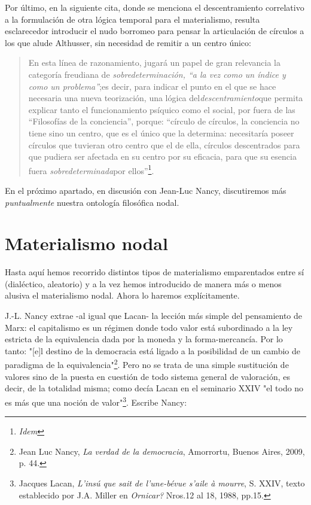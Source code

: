 \documentclass{book}
\begin{document}
Por último, en la siguiente cita, donde se menciona el descentramiento
correlativo a la formulación de otra lógica temporal para el
materialismo, resulta esclarecedor introducir el nudo borromeo para
pensar la articulación de círculos a los que alude Althusser, sin
necesidad de remitir a un centro único:

\begin{quote}
En esta línea de razonamiento, jugará un papel de gran relevancia la
categoría freudiana de \emph{sobredeterminación, ``a la vez como un
índice y como un problema''};es decir, para indicar el punto en el que
se hace necesaria una nueva teorización, una lógica
del\emph{descentramiento}que permita explicar tanto el funcionamiento
psíquico como el social, por fuera de las ``Filosofías de la
conciencia'', porque: ``círculo de círculos, la conciencia no tiene sino
un centro, que es el único que la determina: necesitaría poseer círculos
que tuvieran otro centro que el de ella, círculos descentrados para que
pudiera ser afectada en su centro por su eficacia, para que su esencia
fuera \emph{sobredeterminada}por ellos''\footnote{\emph{Idem}}.
\end{quote}

En el próximo apartado, en discusión con Jean-Luc Nancy, discutiremos
más \emph{puntualmente} nuestra ontología filosófica nodal.

\section{Materialismo nodal}

Hasta aquí hemos recorrido distintos tipos de materialismo emparentados
entre sí (dialéctico, aleatorio) y a la vez hemos introducido de manera
más o menos alusiva el materialismo nodal. Ahora lo haremos
explícitamente.

J.-L. Nancy extrae -al igual que Lacan- la lección más simple del
pensamiento de Marx: el capitalismo es un régimen donde todo valor está
subordinado a la ley estricta de la equivalencia dada por la moneda y la
forma-mercancía. Por lo tanto: "{[}e{]}l destino de la democracia está
ligado a la posibilidad de un cambio de paradigma de la
equivalencia"\footnote{Jean Luc Nancy, \emph{La verdad de la
  democracia}, Amorrortu, Buenos Aires, 2009, p. 44.}. Pero no se trata
de una simple sustitución de valores sino de la puesta en cuestión de
todo sistema general de valoración, es decir, de la totalidad misma;
como decía Lacan en el seminario XXIV "el todo no es más que una noción
de valor"\footnote{Jacques Lacan, \emph{L'insú que sait de l'une-bévue
  s'aile à mourre}, S. XXIV, texto establecido por J.A. Miller en
  \emph{Ornicar?} Nros.12 al 18, 1988, pp.15.}. Escribe Nancy:
\end{document}
